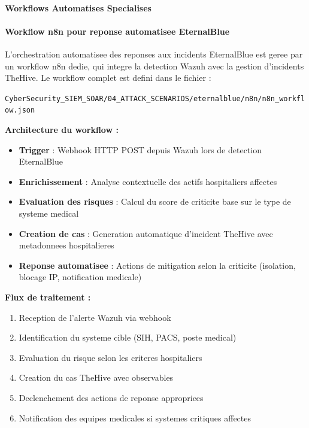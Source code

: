 \paragraph{Workflows Automatises Specialises}

\paragraph{Workflow n8n pour reponse automatisee EternalBlue}

L'orchestration automatisee des reponses aux incidents EternalBlue est geree par un workflow n8n dedie, qui integre la detection Wazuh avec la gestion d'incidents TheHive. Le workflow complet est defini dans le fichier :

\texttt{CyberSecurity\_SIEM\_SOAR/04\_ATTACK\_SCENARIOS/eternalblue/n8n/n8n\_workflow.json}

\textbf{Architecture du workflow :}
\begin{itemize}
    \item \textbf{Trigger} : Webhook HTTP POST depuis Wazuh lors de detection EternalBlue
    \item \textbf{Enrichissement} : Analyse contextuelle des actifs hospitaliers affectes
    \item \textbf{Evaluation des risques} : Calcul du score de criticite base sur le type de systeme medical
    \item \textbf{Creation de cas} : Generation automatique d'incident TheHive avec metadonnees hospitalieres
    \item \textbf{Reponse automatisee} : Actions de mitigation selon la criticite (isolation, blocage IP, notification medicale)
\end{itemize}

\textbf{Flux de traitement :}
\begin{enumerate}
    \item Reception de l'alerte Wazuh via webhook
    \item Identification du systeme cible (SIH, PACS, poste medical)
    \item Evaluation du risque selon les criteres hospitaliers
    \item Creation du cas TheHive avec observables
    \item Declenchement des actions de reponse appropriees
    \item Notification des equipes medicales si systemes critiques affectes
\end{enumerate}

